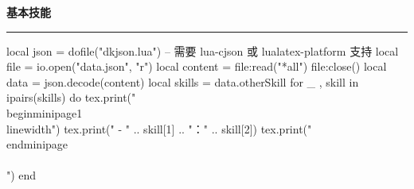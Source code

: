 \documentclass[10pt, a4paper, oneside]{ctexart}
\begin{document}
\ifdefined\otherSkill
\begin{minipage}{1\textwidth}
    \large{\ifdefined\showIcon \makebox[\iconAlignWide][c]{\faTools} \fi \textbf{基本技能}}
\end{minipage}
\rule{\linewidth}{\lineSize}
\begin{center}
    \begin{minipage}{0.9\textwidth}
        \begin{luacode}
            local json = dofile("dkjson.lua")  -- 需要 lua-cjson 或 lualatex-platform 支持
            local file = io.open("data.json", "r")
            local content = file:read("*all")
            file:close()
            local data = json.decode(content)
            local skills = data.otherSkill
            for _ , skill in ipairs(skills) do
                tex.print("\\begin{minipage}{1\\linewidth}")
                tex.print(" - " .. skill[1] .. "：" .. skill[2])
                tex.print("\\end{minipage}\\\\[0.5em]")
            end
        \end{luacode}
    \end{minipage}
\end{center}
\fi
\end{document}
